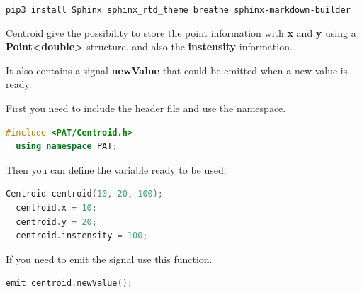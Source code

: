 \texttt{pip3\ install\ Sphinx\ sphinx\_rtd\_theme\ breathe\ sphinx-markdown-builder}


Centroid give the possibility to store the point information with
\textbf{x} and \textbf{y} using a
\textbf{Point\textless double\textgreater{}} structure, and also the
\textbf{instensity} information.

It also contains a signal \textbf{newValue} that could be emitted
when a new value is ready.

First you need to include the header file and use the namespace.

\begin{lstlisting}[language=c++, gobble=2]
  #include <PAT/Centroid.h>
  using namespace PAT;
\end{lstlisting}

Then you can define the variable ready to be used.

\begin{lstlisting}[language=c++, gobble=2]
  Centroid centroid(10, 20, 100);
  centroid.x = 10;
  centroid.y = 20;
  centroid.instensity = 100;
\end{lstlisting}

If you need to emit the signal use this function.

\begin{lstlisting}[language=c++, gobble=2]
  emit centroid.newValue();
\end{lstlisting}

